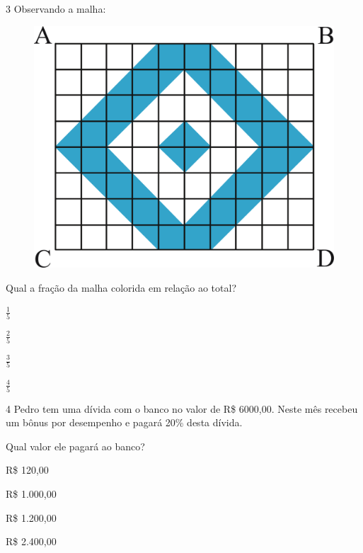 \num{3} Observando a malha:

\begin{figure}[htpb!]
\centering
\includegraphics[width=\textwidth]{./ilustras-mat/Simulado_1-atividade_3.png}
\end{figure}

Qual a fração da malha colorida em relação ao total?

\begin{escolha}

  \item $\frac{1}{5}$

  \item $\frac{2}{5}$

  \item $\frac{3}{5}$

  \item $\frac{4}{5}$

\end{escolha}

\num{4} Pedro tem uma dívida com o banco no valor de R\$ 6000,00. Neste mês
recebeu um bônus por desempenho e pagará 20\% desta dívida.

Qual valor ele pagará ao banco?

\begin{escolha}

  \item R\$ 120,00

  \item R\$ 1.000,00

  \item R\$ 1.200,00

  \item R\$ 2.400,00

\end{escolha}


